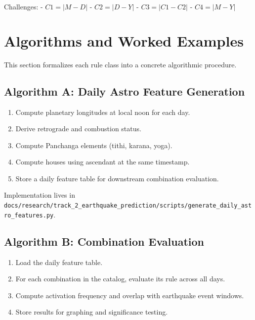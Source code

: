 \documentclass[
  11pt,
  a4paper,
  oneside,
  openany]{report}
\providecommand{\tightlist}{%
  \setlength{\itemsep}{0pt}\setlength{\parskip}{0pt}}\usepackage{longtable,booktabs,array}
\begin{document}
Challenges: - \(C1 = |M - D|\) - \(C2 = |D - Y|\) - \(C3 = |C1 - C2|\) -
\(C4 = |M - Y|\)

\chapter{Algorithms and Worked
Examples}\label{algorithms-and-worked-examples}

This section formalizes each rule class into a concrete algorithmic
procedure.

\section{Algorithm A: Daily Astro Feature
Generation}\label{algorithm-a-daily-astro-feature-generation}

\begin{enumerate}
\def\labelenumi{\arabic{enumi}.}
\tightlist
\item
  Compute planetary longitudes at local noon for each day.
\item
  Derive retrograde and combustion status.
\item
  Compute Panchanga elements (tithi, karana, yoga).
\item
  Compute houses using ascendant at the same timestamp.
\item
  Store a daily feature table for downstream combination evaluation.
\end{enumerate}

Implementation lives in
\texttt{docs/research/track\_2\_earthquake\_prediction/scripts/generate\_daily\_astro\_features.py}.

\section{Algorithm B: Combination
Evaluation}\label{algorithm-b-combination-evaluation}

\begin{enumerate}
\def\labelenumi{\arabic{enumi}.}
\tightlist
\item
  Load the daily feature table.
\item
  For each combination in the catalog, evaluate its rule across all
  days.
\item
  Compute activation frequency and overlap with earthquake event
  windows.
\item
  Store results for graphing and significance testing.
\end{enumerate}
\end{document}
